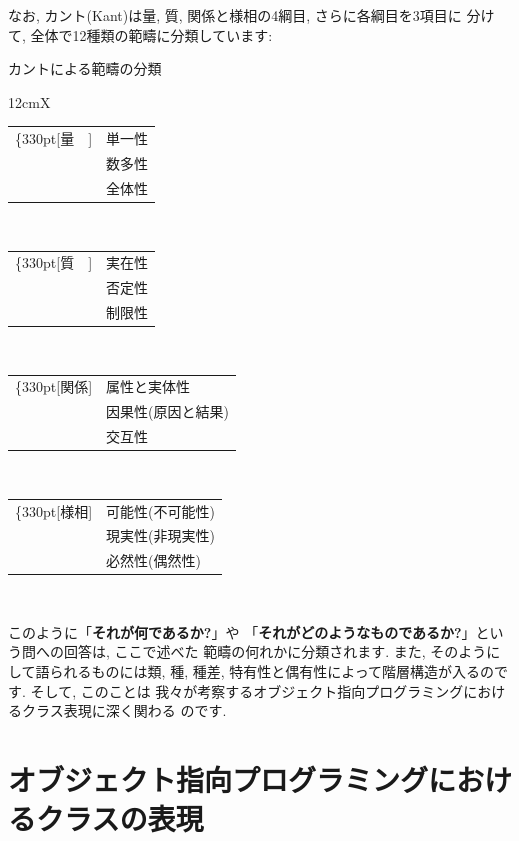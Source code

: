 \documentclass[b5j,8pt,twocolumn]{ltjsarticle}
\begin{document}
なお, カント(Kant)は量, 質, 関係と様相の4綱目, さらに各綱目を3項目に
分けて, 全体で12種類の範疇に分類しています:


\begin{itembox}[c]{カントによる範疇の分類}
{\footnotesize
\begin{tabularx}{12cm}{X}
\begin{tabular}[t]{rl}
\ldelim\{{3}{30pt}[量　]&
単一性\\
&数多性\\
&全体性\\
\end{tabular}
\\
\begin{tabular}[t]{rl}
\ldelim\{{3}{30pt}[質　]&
実在性\\
&否定性\\
&制限性\\
\end{tabular}
\\
\begin{tabular}[t]{rl}
\ldelim\{{3}{30pt}[関係]&
属性と実体性\\
&因果性(原因と結果)\\
&交互性\\
\end{tabular}
\\
\begin{tabular}[t]{rl}
\ldelim\{{3}{30pt}[様相]&
可能性(不可能性)\\
&現実性(非現実性)\\
&必然性(偶然性)\\
\end{tabular}
\\
\end{tabularx}
}
\end{itembox}


このように「\textbf{それが何であるか?}」や
「\textbf{それがどのようなものであるか?}」という問への回答は, ここで述べた
範疇の何れかに分類されます. また, そのようにして語られるものには類, 種,
 種差, 特有性と偶有性によって階層構造が入るのです. そして, このことは
我々が考察するオブジェクト指向プログラミングにおけるクラス表現に深く関わる
のです.

\section{オブジェクト指向プログラミングにおけるクラスの表現}
\end{document}
